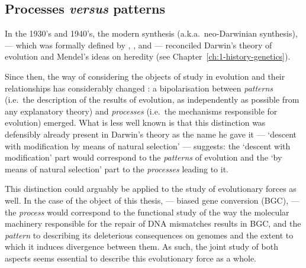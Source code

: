 \subsection{Processes \textit{versus} patterns} 

In the 1930's and 1940's, the modern synthesis (a.k.a.\ neo-Darwinian synthesis), — which was formally defined by \citet{dobzhansky1937genetic}, \citet{huxley1942evolution}, \citet{mayr1942systematics} and \citet{simpson1944tempo} — reconciled Darwin's theory of evolution and Mendel's ideas on heredity (see Chapter~\ref{ch:1-history-genetics}).

Since then, the way of considering the objects of study in evolution and their relationships has considerably changed \citep[reviewed in][]{paulin2015epistemologie}: a bipolarisation between \textit{patterns} (i.e.\ the description of the results of evolution, as independently as possible from any explanatory theory) and \textit{processes} (i.e.\ the mechanisms responsible for evolution) emerged.
What is less well known is that this distinction was defensibly already present in Darwin's theory \citep{gayon2018connaissance} as the name he gave it — ‘descent with modification by means of natural selection’ — suggests: the ‘descent with modification’ part would correspond to the \textit{patterns} of evolution and the ‘by means of natural selection’ part to the \textit{processes} leading to it.

This distinction could arguably be applied to the study of evolutionary forces as well.
In the case of the object of this thesis, — biased gene conversion (BGC), — the \textit{process} would correspond to the functional study of the way the molecular machinery responsible for the repair of DNA mismatches results in BGC, and the \textit{pattern} to describing its deleterious consequences on genomes and the extent to which it induces divergence between them.
As such, the joint study of both aspects seems essential to describe this evolutionary force as a whole.

